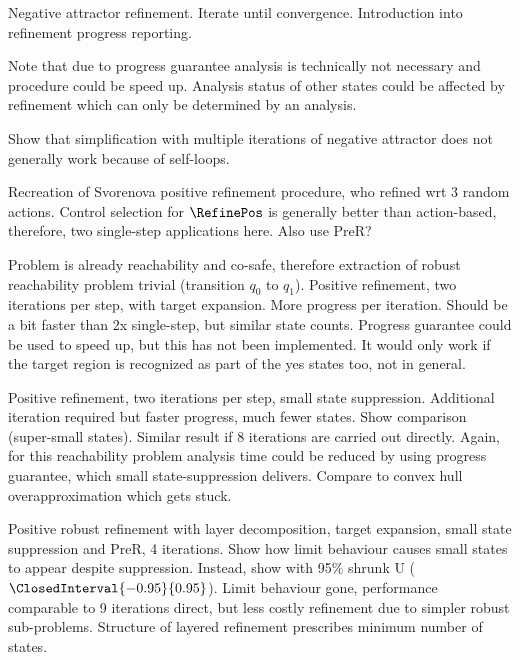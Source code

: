     Negative attractor refinement.
    Iterate until convergence.
    Introduction into refinement progress reporting.

    Note that due to progress guarantee analysis is technically not necessary and procedure could be speed up.
    Analysis status of other states could be affected by refinement which can only be determined by an analysis.

    Show that simplification with multiple iterations of negative attractor does not generally work because of self-loops.

\stopsubsection


\startsubsection[title={Positive Robust Refinement},reference=sec:cases-integrator-positive]

    Recreation of Svorenova positive refinement procedure, who refined wrt 3 random actions.
    Control selection for $\RefinePos$ is generally better than action-based, therefore, two single-step applications here.
    Also use PreR?

    Problem is already reachability and co-safe, therefore extraction of robust reachability problem trivial (transition $q_0$ to $q_1$).
    Positive refinement, two iterations per step, with target expansion.
    More progress per iteration.
    Should be a bit faster than 2x single-step, but similar state counts.
    Progress guarantee could be used to speed up, but this has not been implemented.
    It would only work if the target region is recognized as part of the yes states too, not in general.

    Positive refinement, two iterations per step, small state suppression.
    Additional iteration required but faster progress, much fewer states.
    Show comparison (super-small states).
    Similar result if 8 iterations are carried out directly.
    Again, for this reachability problem analysis time could be reduced by using progress guarantee, which small state-suppression delivers.
    Compare to convex hull overapproximation which gets stuck.

\stopsubsection


\startsubsection[title={Positive Robust Refinement with Layer Decomposition},reference=sec:cases-integrator-layered]

    Positive robust refinement with layer decomposition, target expansion, small state suppression and PreR, 4 iterations.
    Show how limit behaviour causes small states to appear despite suppression.
    Instead, show with 95\% shrunk U ($\ClosedInterval{-0.95}{0.95}$).
    Limit behaviour gone, performance comparable to 9 iterations direct, but less costly refinement due to simpler robust sub-problems.
    Structure of layered refinement prescribes minimum number of states.

